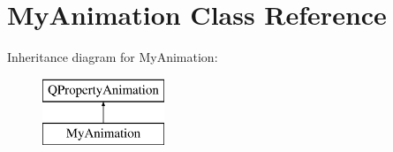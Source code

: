 \hypertarget{class_my_animation}{\section{My\-Animation Class Reference}
\label{class_my_animation}
}
Inheritance diagram for My\-Animation\-:\begin{figure}[H]
\begin{center}
\leavevmode
\includegraphics[height=2.000000cm]{class_my_animation}
\end{center}
\end{figure}
